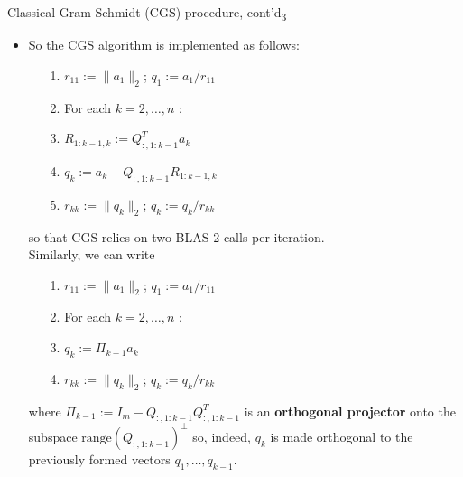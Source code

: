 \documentclass[t,usepdftitle=false]{beamer}
\begin{document}
\begin{frame}{Classical Gram-Schmidt (CGS) procedure, cont'd\textsubscript{3}}
\begin{itemize}
\item So the CGS algorithm is implemented as follows:\vspace{.2cm}
\begin{itemize}
\item[1.] $r_{11}:=\|a_1\|_2$; $q_1:=a_1/r_{11}$ \vspace{.1cm}
\item[2.] For each $k=2,\dots,n$ :\vspace{.1cm}
\item[3.]\hspace{.4cm}$R_{1:k-1,k}:=Q_{:,1:k-1}^Ta_k${\color{gray}{ // BLAS 2}}\vspace{.1cm}
\item[4.]\hspace{.4cm}$q_k:=a_k-Q_{:,1:k-1}R_{1:k-1,k}${\color{gray}{ // BLAS 2}}\vspace{.1cm}
\item[5.]\hspace{.4cm}$r_{kk}:=\|q_k\|_2$; $q_{k}:=q_k/r_{kk}$
\end{itemize}\vspace{.2cm}
so that CGS relies on two BLAS 2 calls per iteration.\vspace{.1cm}\\
Similarly, we can write 
\vspace{.2cm}
\begin{itemize}
\item[1.] $r_{11}:=\|a_1\|_2$; $q_1:=a_1/r_{11}$ \vspace{.1cm}
\item[2.] For each $k=2,\dots,n$ :\vspace{.1cm}
\item[3.]\hspace{.4cm}$q_k:=\Pi_{k-1}a_k$\vspace{.1cm}
\item[4.]\hspace{.4cm}$r_{kk}:=\|q_k\|_2$; $q_{k}:=q_k/r_{kk}$
\end{itemize}\vspace{.2cm}
where $\Pi_{k-1}:=I_m-Q_{:,1:k-1}Q_{:,1:k-1}^T$ is an \textbf{orthogonal projector} onto the subspace $\mathrm{range}(Q_{:,1:k-1})^\perp$ so, indeed, $q_k$ is made orthogonal to the previously formed vectors $q_1,\dots,q_{k-1}$.
\end{itemize}
\end{frame}
\end{document}
